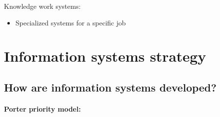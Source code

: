 \documentclass{article}
\begin{document}
Knowledge work systems:

\begin{itemize}
\item  Specialized systems for a specific job
\end{itemize}

\section{Information systems strategy}

\subsection{How are information systems developed?}

\paragraph{Porter priority model:}
\end{document}
